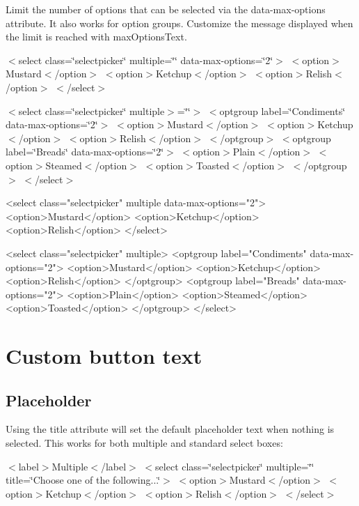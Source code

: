 Limit the number of options that can be selected via the {\ttfamily data-\/max-\/options} attribute. It also works for option groups. Customize the message displayed when the limit is reached with {\ttfamily max\+Options\+Text}.

 $<$select class=\char`\"{}selectpicker\char`\"{} multiple=\char`\"{}\char`\"{} data-\/max-\/options=\char`\"{}2\char`\"{}$>$ $<$option$>$Mustard$<$/option$>$ $<$option$>$Ketchup$<$/option$>$ $<$option$>$Relish$<$/option$>$ $<$/select$>$

 $<$select class=\char`\"{}selectpicker\char`\"{} multiple$>$=\char`\"{}\char`\"{}$>$ $<$optgroup label=\char`\"{}\+Condiments\char`\"{} data-\/max-\/options=\char`\"{}2\char`\"{}$>$ $<$option$>$Mustard$<$/option$>$ $<$option$>$Ketchup$<$/option$>$ $<$option$>$Relish$<$/option$>$ $<$/optgroup$>$ $<$optgroup label=\char`\"{}\+Breads\char`\"{} data-\/max-\/options=\char`\"{}2\char`\"{}$>$ $<$option$>$Plain$<$/option$>$ $<$option$>$Steamed$<$/option$>$ $<$option$>$Toasted$<$/option$>$ $<$/optgroup$>$ $<$/select$>$ 


\begin{DoxyCode}
<select class="selectpicker" multiple data-max-options="2">
  <option>Mustard</option>
  <option>Ketchup</option>
  <option>Relish</option>
</select>

<select class="selectpicker" multiple>
  <optgroup label="Condiments" data-max-options="2">
    <option>Mustard</option>
    <option>Ketchup</option>
    <option>Relish</option>
  </optgroup>
  <optgroup label="Breads" data-max-options="2">
    <option>Plain</option>
    <option>Steamed</option>
    <option>Toasted</option>
  </optgroup>
</select>
\end{DoxyCode}


\section*{Custom button text}





\subsection*{Placeholder}

Using the {\ttfamily title} attribute will set the default placeholder text when nothing is selected. This works for both multiple and standard select boxes\+:

  $<$label$>$Multiple$<$/label$>$ $<$select class=\char`\"{}selectpicker\char`\"{} multiple=\char`\"{}\char`\"{} title=\char`\"{}\+Choose one of the following...\char`\"{}$>$ $<$option$>$Mustard$<$/option$>$ $<$option$>$Ketchup$<$/option$>$ $<$option$>$Relish$<$/option$>$ $<$/select$>$ 

